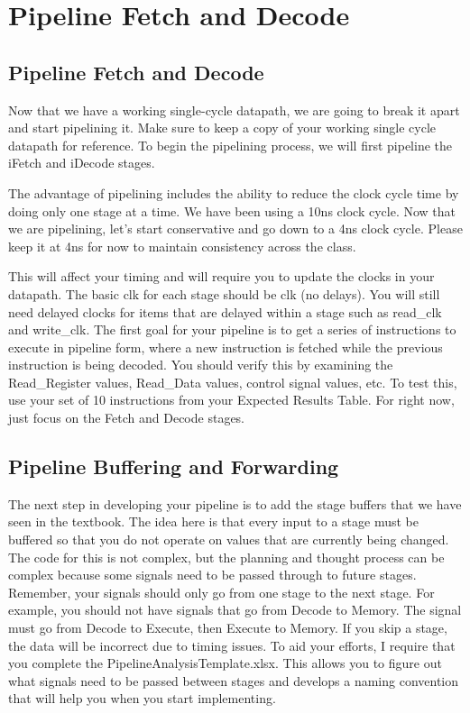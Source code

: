 \chapter{Pipeline Fetch and Decode}


\section{Pipeline Fetch and Decode}
Now that we have a working single-cycle datapath, we are going to break it apart and start pipelining it.  Make sure to keep a copy of your working single cycle datapath for reference.  To begin the pipelining process, we will first pipeline the iFetch and iDecode stages.

The advantage of pipelining includes the ability to reduce the clock cycle time by doing only one stage at a time.  We have been using a 10ns clock cycle.  Now that we are pipelining, let's start conservative and go down to a 4ns clock cycle.  Please keep it at 4ns for now to maintain consistency across the class.  

This will affect your timing and will require you to update the clocks in your datapath.  The basic clk for each stage should be clk (no delays).  You will still need delayed clocks for items that are delayed within a stage such as read\_clk and write\_clk.  The first goal for your pipeline is to get a series of instructions to execute in pipeline form, where a new instruction is fetched while the previous instruction is being decoded.  You should verify this by examining the Read\_Register values, Read\_Data values, control signal values, etc.  To test this, use your set of 10 instructions from your Expected Results Table.  For right now, just focus on the Fetch and Decode stages.

\section{Pipeline Buffering and Forwarding}
The next step in developing your pipeline is to add the stage buffers that we have seen in the textbook.  The idea here is that every input to a stage must be buffered so that you do not operate on values that are currently being changed.  The code for this is not complex, but the planning and thought process can be complex because some signals need to be passed through to future stages.  Remember, your signals should only go from one stage to the next stage.  For example, you should not have signals that go from Decode to Memory.  The signal must go from Decode to Execute, then Execute to Memory.  If you skip a stage, the data will be incorrect due to timing issues.  To aid your efforts, I require that you complete the PipelineAnalysisTemplate.xlsx.  This allows you to figure out what signals need to be passed between stages and develops a naming convention that will help you when you start implementing.

